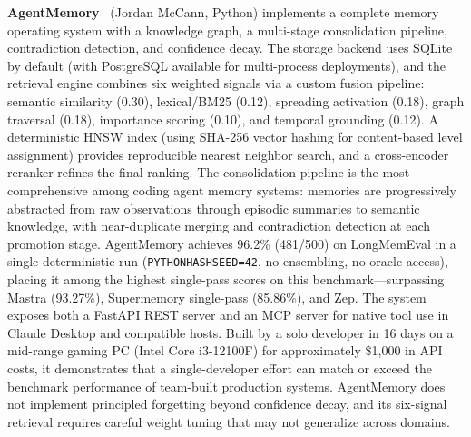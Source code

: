 \textbf{AgentMemory}~\cite{agentmemory2026} (Jordan McCann, Python)
implements a complete memory operating system with a knowledge graph,
a multi-stage consolidation pipeline, contradiction detection, and
confidence decay.  The storage backend uses SQLite by default (with
PostgreSQL available for multi-process deployments), and the retrieval
engine combines six weighted signals via a custom fusion pipeline:
semantic similarity (0.30), lexical/BM25 (0.12), spreading activation
(0.18), graph traversal (0.18), importance scoring (0.10), and temporal
grounding (0.12).  A deterministic HNSW index (using SHA-256 vector
hashing for content-based level assignment) provides reproducible nearest
neighbor search, and a cross-encoder reranker refines the final ranking.
The consolidation pipeline is the most comprehensive among coding agent
memory systems: memories are progressively abstracted from raw
observations through episodic summaries to semantic knowledge, with
near-duplicate merging and contradiction detection at each promotion
stage.  AgentMemory achieves 96.2\% (481/500) on LongMemEval in a single
deterministic run (\texttt{PYTHONHASHSEED=42}, no ensembling, no oracle
access), placing it among the highest single-pass scores on this
benchmark---surpassing Mastra (93.27\%), Supermemory single-pass
(85.86\%), and Zep.  The system exposes both a FastAPI REST server and an
MCP server for native tool use in Claude Desktop and compatible hosts.
Built by a solo developer in 16 days on a mid-range gaming PC (Intel
Core i3-12100F) for approximately \$1{,}000 in API costs, it
demonstrates that a single-developer effort can match or exceed the
benchmark performance of team-built production systems.  AgentMemory does
not implement principled forgetting beyond confidence decay, and its
six-signal retrieval requires careful weight tuning that may not
generalize across domains.

